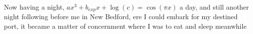 \documentclass{article}
\begin{document}
Now having a night, $a x^{3} + b_{exp} x + \log(c)=\cos(\pi x)$ a day, and still another night following before me in New Bedford, ere I could embark for my destined port, it became a matter of concernment where I was to eat and sleep meanwhile
\end{document}
